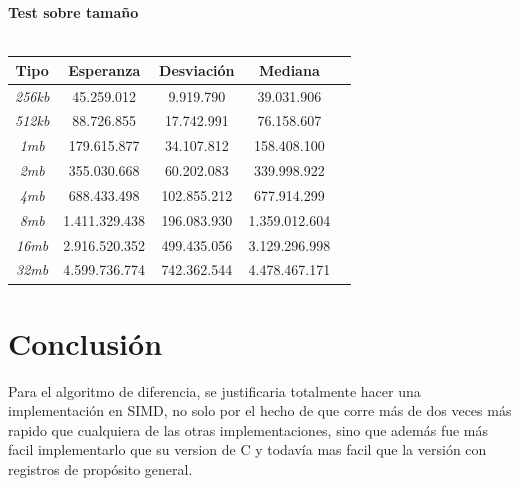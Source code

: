 \documentclass[a4paper]{article}
\begin{document}
\newpage
\begin{center}
          \textbf{Test sobre tamaño}  \\ 
          \hfill \\
        \begin{tabular}[c]{|c|c|c|c|c|}
        \hline
      \textbf{Tipo}  & \textbf{Esperanza} & \textbf{Desviación} & \textbf{Mediana}\\

    	\hline
\textit{256kb} &	45.259.012 & 9.919.790 & 39.031.906 \\
		\hline
\textit{512kb} &	88.726.855 & 17.742.991 & 76.158.607 \\
		\hline
\textit{1mb} &	179.615.877 & 34.107.812 & 158.408.100  \\
		\hline
\textit{2mb} &	355.030.668 & 60.202.083 & 339.998.922  \\
		\hline
\textit{4mb} &	688.433.498 & 102.855.212 & 677.914.299  \\
		\hline
\textit{8mb} &	1.411.329.438 & 196.083.930 & 1.359.012.604  \\
		\hline
\textit{16mb} & 2.916.520.352 & 499.435.056 & 3.129.296.998  \\
		\hline
\textit{32mb} &	4.599.736.774 & 742.362.544 & 4.478.467.171  \\
		\hline

	\end{tabular}
\end{center}

\section{Conclusión}

 Para el algoritmo de diferencia, se justificaria totalmente hacer una implementación en SIMD, no solo por el hecho de que corre más de dos veces más rapido que cualquiera de las otras implementaciones, sino que además fue más facil implementarlo que su version de C y todavía mas facil que la versión con registros de propósito general. 





\nocite{*}
\end{document}
